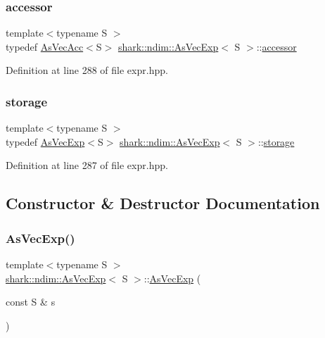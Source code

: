 \subsubsection{\texorpdfstring{accessor}{accessor}}
{\footnotesize\ttfamily template$<$typename S $>$ \\
typedef \hyperlink{classshark_1_1ndim_1_1_as_vec_acc}{As\+Vec\+Acc}$<$S$>$ \hyperlink{classshark_1_1ndim_1_1_as_vec_exp}{shark\+::ndim\+::\+As\+Vec\+Exp}$<$ S $>$\+::\hyperlink{classshark_1_1ndim_1_1_as_vec_exp_3_01_s_01_4_a94453f3532458ea9d9ff0137be5bf4b5}{accessor}}



Definition at line 288 of file expr.\+hpp.

\hypertarget{classshark_1_1ndim_1_1_as_vec_exp_3_01_s_01_4_a3ffb3edaef06af8cd87597334cad8f21}{}\label{classshark_1_1ndim_1_1_as_vec_exp_3_01_s_01_4_a3ffb3edaef06af8cd87597334cad8f21} 
\subsubsection{\texorpdfstring{storage}{storage}}
{\footnotesize\ttfamily template$<$typename S $>$ \\
typedef \hyperlink{classshark_1_1ndim_1_1_as_vec_exp}{As\+Vec\+Exp}$<$S$>$ \hyperlink{classshark_1_1ndim_1_1_as_vec_exp}{shark\+::ndim\+::\+As\+Vec\+Exp}$<$ S $>$\+::\hyperlink{classshark_1_1ndim_1_1_as_vec_exp_3_01_s_01_4_a3ffb3edaef06af8cd87597334cad8f21}{storage}}



Definition at line 287 of file expr.\+hpp.



\subsection{Constructor \& Destructor Documentation}
\hypertarget{classshark_1_1ndim_1_1_as_vec_exp_3_01_s_01_4_a1900f5353d7b7d0f644d847cf4b1180c}{}\label{classshark_1_1ndim_1_1_as_vec_exp_3_01_s_01_4_a1900f5353d7b7d0f644d847cf4b1180c} 
\subsubsection{\texorpdfstring{As\+Vec\+Exp()}{AsVecExp()}}
{\footnotesize\ttfamily template$<$typename S $>$ \\
\hyperlink{classshark_1_1ndim_1_1_as_vec_exp}{shark\+::ndim\+::\+As\+Vec\+Exp}$<$ S $>$\+::\hyperlink{classshark_1_1ndim_1_1_as_vec_exp}{As\+Vec\+Exp} (\begin{DoxyParamCaption}\item[{const S \&}]{s }\end{DoxyParamCaption})}



